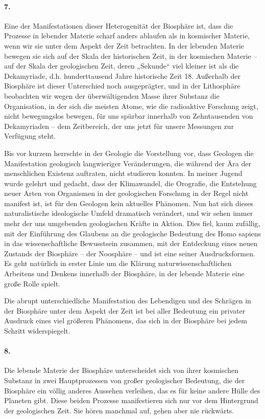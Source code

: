\documentclass[11pt,a4paper]{book}
\begin{document}
\paragraph{7.}
Eine der Manifestationen dieser Heterogenität der Biosphäre ist, dass die
Prozesse in lebender Materie scharf anders ablaufen als in kosmischer Materie,
wenn wir sie unter dem Aspekt der Zeit betrachten. In der lebenden Materie
bewegen sie sich auf der Skala der historischen Zeit, in der kosmischen
Materie -- auf der Skala der geologischen Zeit, deren „Sekunde“ viel kleiner
ist als die Dekamyriade, d.h. hunderttausend Jahre historische Zeit 18.
Außerhalb der Biosphäre ist dieser Unterschied noch ausgeprägter, und in der
Lithosphäre beobachten wir wegen der überwältigenden Masse ihrer Substanz die
Organisation, in der sich die meisten Atome, wie die radioaktive Forschung
zeigt, nicht bewegungslos bewegen, für uns spürbar innerhalb von Zehntausenden
von Dekamyriaden -- dem Zeitbereich, der uns jetzt für unsere Messungen zur
Verfügung steht.

Bis vor kurzem herrschte in der Geologie die Vorstellung vor, dass Geologen
die Manifestation geologisch langwieriger Veränderungen, die während der Ära
der menschlichen Existenz auftraten, nicht studieren konnten. In meiner Jugend
wurde gelehrt und gedacht, dass der Klimawandel, die Orografie, die Entstehung
neuer Arten von Organismen in der geologischen Forschung in der Regel nicht
manifest ist, ist für den Geologen kein aktuelles Phänomen. Nun hat sich
dieses naturalistische ideologische Umfeld dramatisch verändert, und wir sehen
immer mehr der uns umgebenden geologischen Kräfte in Aktion. Dies fiel, kaum
zufällig, mit der Einführung des Glaubens an die geologische Bedeutung des
Homo sapiens in das wissenschaftliche Bewusstsein zusammen, mit der Entdeckung
eines neuen Zustands der Biosphäre -- der Noosphäre -- und ist eine seiner
Ausdrucksformen. Es geht natürlich in erster Linie um die Klärung
naturwissenschaftlichen Arbeitens und Denkens innerhalb der Biosphäre, in der
lebende Materie eine große Rolle spielt.

Die abrupt unterschiedliche Manifestation des Lebendigen und des Schrägen in
der Biosphäre unter dem Aspekt der Zeit ist bei aller Bedeutung ein privater
Ausdruck eines viel größeren Phänomens, das sich in der Biosphäre bei jedem
Schritt widerspiegelt.

\paragraph{8.}
Die lebende Materie der Biosphäre unterscheidet sich von ihrer kosmischen
Substanz in zwei Hauptprozessen von großer geologischer Bedeutung, die der
Biosphäre ein völlig anderes Aussehen verleihen, das es für keine andere Hülle
des Planeten gibt. Diese beiden Prozesse manifestieren sich nur vor dem
Hintergrund der geologischen Zeit. Sie hören manchmal auf, gehen aber nie
rückwärts.
\end{document}
